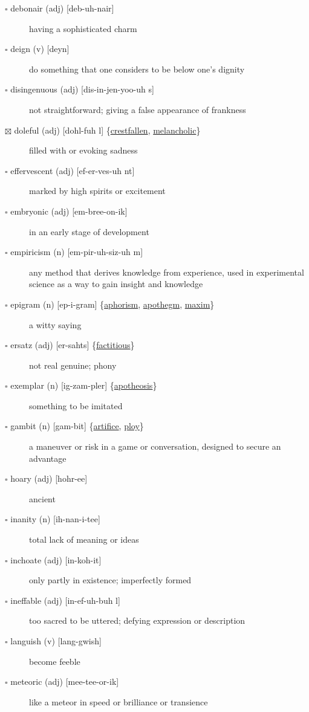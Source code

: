 \documentclass[11pt]{article}
\begin{document}
\begin{description}
\item[{$\square$ debonair (adj) [deb-uh-nair]}] having a sophisticated charm
\item[{$\square$ deign (v) [deyn]}] do something that one considers to be below one's dignity
\item[{$\square$ disingenuous (adj) [dis-in-jen-yoo-uh s]}] not straightforward; giving a false appearance of frankness
\item[{$\boxtimes$ \label{org0625e23}doleful (adj) [dohl-fuh l] \{\hyperref[orga7eafdc]{crestfallen}, \hyperref[orgd6cf18c]{melancholic}\}}] filled with or evoking sadness
\item[{$\square$ effervescent (adj) [ef-er-ves-uh nt]}] marked by high spirits or excitement
\item[{$\square$ embryonic (adj) [em-bree-on-ik]}] in an early stage of development
\item[{$\square$ empiricism (n) [em-pir-uh-siz-uh m]}] any method that derives knowledge from experience, used in experimental science as a way to gain insight and knowledge
\item[{$\square$ \label{org46c3fc2}epigram (n) [ep-i-gram] \{\hyperref[org7a7c9aa]{aphorism}, \hyperref[org3dc6b52]{apothegm}, \hyperref[org0130f55]{maxim}\}}] a witty saying
\item[{$\square$ \label{org352b751}ersatz (adj) [er-sahts] \{\hyperref[orgb99bfb4]{factitious}\}}] not real genuine; phony
\item[{$\square$ \label{orgab46517}exemplar (n) [ig-zam-pler] \{\hyperref[org5669122]{apotheosis}\}}] something to be imitated
\item[{$\square$ \label{org6115101}gambit (n) [gam-bit] \{\hyperref[org79f386c]{artifice}, \hyperref[orgb05b474]{ploy}\}}] a maneuver or risk in a game or conversation, designed to secure an advantage
\item[{$\square$ hoary (adj) [hohr-ee]}] ancient
\item[{$\square$ inanity (n) [ih-nan-i-tee]}] total lack of meaning or ideas
\item[{$\square$ inchoate (adj) [in-koh-it]}] only partly in existence; imperfectly formed
\item[{$\square$ ineffable (adj) [in-ef-uh-buh l]}] too sacred to be uttered; defying expression or description
\item[{$\square$ \label{org7e478c0} languish (v) [lang-gwish]}] become feeble
\item[{$\square$ meteoric (adj) [mee-tee-or-ik]}] like a meteor in speed or brilliance or transience

\end{description}
\end{document}
